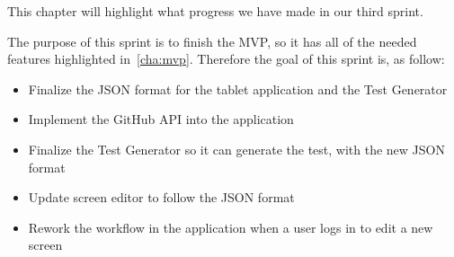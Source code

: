 This chapter will highlight what progress we have made in our third sprint.

The purpose of this sprint is to finish the MVP, so it has all of the needed features highlighted in~\autoref{cha:mvp}.
Therefore the goal of this sprint is, as follow:

\begin{itemize}
    \item Finalize the JSON format for the tablet application and the Test Generator
    \item Implement the GitHub API into the application
    \item Finalize the Test Generator so it can generate the test, with the new JSON format
    \item Update screen editor to follow the JSON format
    \item Rework the workflow in the application when a user logs in to edit a new screen
\end{itemize}

